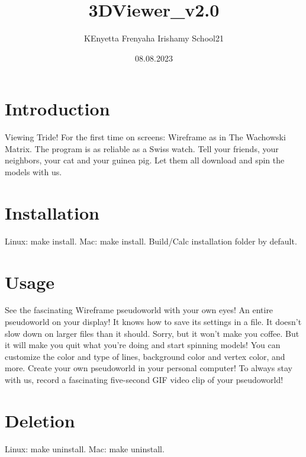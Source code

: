 \documentclass{article}
\title{3DViewer_v2.0}
\author{KEnyetta Frenyaha Irishamy School21}
\date{08.08.2023}
\begin{document}
  
\tableofcontents

\section{Introduction}
   
Viewing Tride! For the first time on screens: Wireframe as in The Wachowski Matrix. 
The program is as reliable as a Swiss watch. Tell your friends, your neighbors, your cat and your guinea pig. 
Let them all download and spin the models with us.

\section*{Installation}

Linux: make install.
Mac: make install.
Build/Calc installation folder by default.

\section{Usage}
       
See the fascinating Wireframe pseudoworld with your own eyes! An entire pseudoworld on your display!  
It knows how to save its settings in a file. It doesn't slow down on larger files than it should. 
Sorry, but it won't make you coffee. But it will make you quit what you're doing and start spinning models! 
You can customize the color and type of lines, background color and vertex color, and more. Create your own pseudoworld in your personal computer! 
To always stay with us, record a fascinating five-second GIF video clip of your pseudoworld!

\section{Deletion}

Linux: make uninstall.
Mac: make uninstall. 
\end{document}
